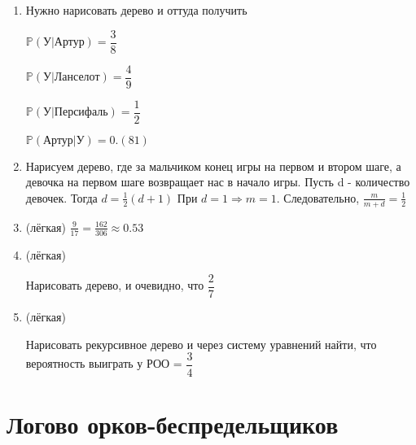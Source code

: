 \documentclass[a4paper,12pt]{article}
\def \P{\mathbb{P}}
\begin{document}
\begin{enumerate}
\item
Нужно нарисовать дерево и оттуда получить

$\P(\text{У}|\text{Артур}) = \dfrac{3}{8}$

$\P(\text{У}|\text{Ланселот}) = \dfrac{4}{9}$

$\P(\text{У}|\text{Персифаль}) = \dfrac{1}{2}$

$\P(\text{Артур}|\text{У}) = 0.(81)$

\item
Нарисуем дерево, где за мальчиком конец игры на первом и втором шаге, а девочка на первом шаге возвращает нас в начало игры. Пусть d - количество девочек. Тогда $ d = \frac{1}{2}(d + 1)$ При $d = 1 \Rightarrow m = 1$. Следовательно, $\frac{m}{m+d} = \frac{1}{2}$
\item (лёгкая)
$\frac{9}{17} = \frac{162}{306} \approx 0.53$

\item (лёгкая)

Нарисовать дерево, и очевидно, что $\dfrac{2}{7}$

\item (лёгкая)

Нарисовать рекурсивное дерево и через систему уравнений найти, что вероятность выиграть у РОО = $\dfrac{3}{4}$

\end{enumerate}
\newpage


\section{Логово орков-беспредельщиков} %
\end{document}

